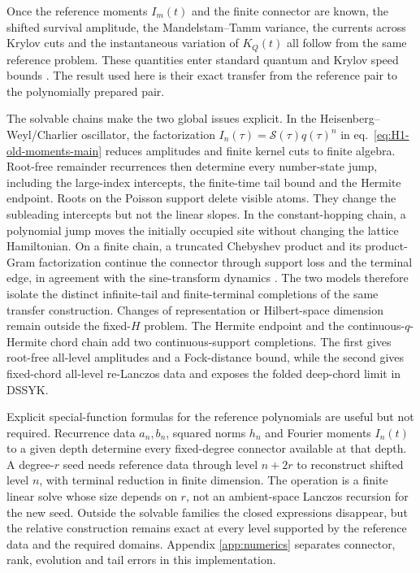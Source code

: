 \documentclass[a4paper,11pt]{article}
\theoremstyle{definition}
\theoremstyle{remark}
\newcommand{\cS}{\mathcal S}
\begin{document}
Once the reference moments $I_m(t)$ and the finite connector are known, the shifted survival amplitude, the Mandelstam--Tamm variance, the currents across Krylov
cuts and the instantaneous variation of $K_Q(t)$ all follow from the same reference problem.
These quantities enter standard quantum and Krylov speed bounds
\cite{MandelstamTamm1945,DeffnerCampbell2017,Hornedal2022,GillSarkar2024}.  The result used here is
their exact transfer from the reference pair to the polynomially prepared pair.

The solvable chains make the two global issues explicit.  In the Heisenberg--Weyl/Charlier
oscillator, the factorization $I_n(\tau)=\cS(\tau)q(\tau)^n$ in eq.~\eqref{eq:H1-old-moments-main} reduces amplitudes and finite kernel
cuts to finite algebra.  Root-free remainder recurrences then determine every number-state jump,
including the large-index intercepts, the finite-time tail bound and the Hermite endpoint.  Roots
on the Poisson support delete visible atoms.  They change the subleading intercepts but not the
linear slopes.
In the constant-hopping chain, a polynomial jump moves the initially occupied site without
changing the lattice Hamiltonian.  On a finite chain, a truncated Chebyshev product and its
product-Gram factorization continue the connector through support loss and the terminal edge, in
agreement with the sine-transform dynamics \cite{Balasubramanian:2025variations}.  The two models
therefore isolate the distinct infinite-tail and finite-terminal completions of the same transfer
construction.  Changes of representation or Hilbert-space dimension remain outside the fixed-$H$ problem.  The Hermite endpoint and the continuous-$q$-Hermite chord chain add two continuous-support completions.  The first gives root-free all-level amplitudes and a Fock-distance bound, while the second gives fixed-chord all-level re-Lanczos data and exposes the folded deep-chord limit in DSSYK.

Explicit special-function formulas for the reference polynomials are useful but not required.  Recurrence data $a_n,b_n$, squared norms $h_n$ and
Fourier moments $I_n(t)$ to a given depth determine every fixed-degree connector available at
that depth.  A degree-$r$ seed needs reference data through level $n+2r$ to reconstruct shifted
level $n$, with terminal reduction in finite dimension.  The operation is a finite linear solve
whose size depends on $r$, not an ambient-space Lanczos recursion for the new seed.  Outside the
solvable families the closed expressions disappear, but the relative construction remains exact
at every level supported by the reference data and the required domains.  Appendix
\ref{app:numerics} separates connector, rank, evolution and tail errors in this implementation.
\end{document}

